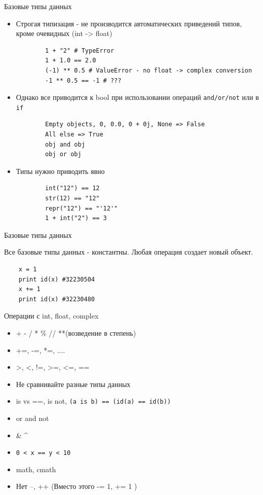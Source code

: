 \documentclass{article}
\begin{document}
\begin{center} Базовые типы данных \end{center}
\begin{itemize}
	\item Строгая типизация - не производится автоматических приведений типов, кроме очевидных (int -> float)
	\vspace{15pt}
	\begin{lstlisting}
		1 + "2" # TypeError
		1 + 1.0 == 2.0
		(-1) ** 0.5 # ValueError - no float -> complex conversion
		-1 ** 0.5 == -1 # ??? 
	\end{lstlisting}

	\item Однако все приводится к bool при использовании операций \lstinline|and/or/not| или в 
	        \lstinline|if|
	\begin{lstlisting}
		Empty objects, 0, 0.0, 0 + 0j, None => False
		All else => True
		obj and obj
		obj or obj
	\end{lstlisting}

	\item Типы нужно приводить явно
	\vspace{15pt}
	\begin{lstlisting}
		int("12") == 12
		str(12) == "12"
		repr("12") == "'12'"
		1 + int("2") == 3
	\end{lstlisting}
\end{itemize}
\newpage

\begin{center} Базовые типы данных \end{center}
Все базовые типы данных - константны. Любая операция создает новый объект.
\begin{lstlisting}
    x = 1
    print id(x) #32230504
    x += 1
    print id(x) #32230480
\end{lstlisting}
\newpage

\begin{center} Операции с int,  float, complex \end{center}
\begin{itemize}
	\item + - / * \% // **(возведение в степень)
	\item +=, -=, *=, ....
	\item >, <, !=, >=, <=, ==
	\item Не сравнивайте разные типы данных
	\item is vs ==, is not, \lstinline!(a is b) == (id(a) == id(b))!
	\item or and not
	\item \& \hspace{10pt} \textbar \hspace{10pt} \textasciicircum
	\item \lstinline!0 < x == y < 10!
	\item math, cmath
	\item Нет --, ++ (Вместо этого -= 1, += 1 )
\end{itemize}
\newpage
\end{document}
